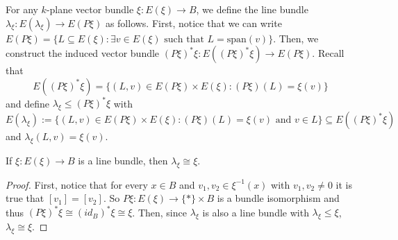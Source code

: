 \begin{definition}\label{def:lambda_xi} For any $k$-plane vector bundle $\xi:E(\xi)\to B$, we define the line bundle $\lambda_{\xi}:E(\lambda_\xi)\to E(P\xi)$ as follows. First, notice that we can write $E(P\xi)=\big\{L\subseteq E(\xi):\exists v\in E(\xi)\text{ such that }L=\mathrm{span}(v)\big\}$. Then, we construct the induced vector bundle $(P\xi)^*\xi:E((P\xi)^*\xi)\to E(P\xi)$. Recall that
\[E((P\xi)^*\xi)=\big\{(L,v)\in E(P\xi)\times E(\xi):(P\xi)(L)=\xi(v)\big\}\]
and define $\lambda_{\xi}\leq(P\xi)^*\xi$ with $E(\lambda_{\xi}):=\big\{(L,v)\in E(P\xi)\times E(\xi):(P\xi)(L)=\xi(v)\text{ and }v\in L\big\}\subseteq E((P\xi)^*\xi)$ and $\lambda_{\xi}(L,v)=\xi(v)$.
\begin{center}
\end{center}
\end{definition}
\begin{remark}\label{rem:lambda_for_line_bundle} If $\xi:E(\xi)\to B$ is a line bundle, then $\lambda_\xi\cong\xi$.
\end{remark}
\begin{proof} First, notice that for every $x\in B$ and $v_1,v_2\in\xi^{-1}(x)$ with $v_1,v_2\neq 0$ it is true that $[v_1]=[v_2]$. So $P\xi:E(\xi)\to \{*\}\times B$ is a bundle isomorphism and thus $(P\xi)^*\xi\cong(id_B)^*\xi\cong\xi$. Then, since $\lambda_{\xi}$ is also a line bundle with $\lambda_{\xi}\leq\xi$, $\lambda_{\xi}\cong\xi$.
\end{proof}

